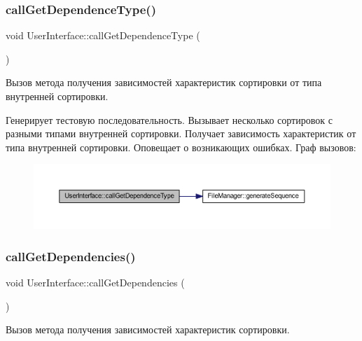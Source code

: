 \subsubsection{\texorpdfstring{call\+Get\+Dependence\+Type()}{callGetDependenceType()}}
{\footnotesize\ttfamily void User\+Interface\+::call\+Get\+Dependence\+Type (\begin{DoxyParamCaption}{ }\end{DoxyParamCaption})\hspace{0.3cm}{\ttfamily [private]}}



Вызов метода получения зависимостей характеристик сортировки от типа внутренней сортировки. 

Генерирует тестовую последовательность. Вызывает несколько сортировок с разными типами внутренней сортировки. Получает зависимость характеристик от типа внутренней сортировки. Оповещает о возникающих ошибках. Граф вызовов\+:\nopagebreak
\begin{figure}[H]
\begin{center}
\leavevmode
\includegraphics[width=350pt]{class_user_interface_aa413c00a65ae4faf9421e9fc359663ec_cgraph}
\end{center}
\end{figure}
\hypertarget{class_user_interface_a332db63dca89d684f7e9e1272f4c3745}{}\label{class_user_interface_a332db63dca89d684f7e9e1272f4c3745} 
\subsubsection{\texorpdfstring{call\+Get\+Dependencies()}{callGetDependencies()}}
{\footnotesize\ttfamily void User\+Interface\+::call\+Get\+Dependencies (\begin{DoxyParamCaption}{ }\end{DoxyParamCaption})\hspace{0.3cm}{\ttfamily [private]}}



Вызов метода получения зависимостей характеристик сортировки. 

